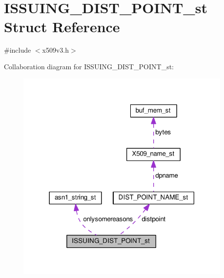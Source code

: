 \hypertarget{struct_i_s_s_u_i_n_g___d_i_s_t___p_o_i_n_t__st}{}\section{I\+S\+S\+U\+I\+N\+G\+\_\+\+D\+I\+S\+T\+\_\+\+P\+O\+I\+N\+T\+\_\+st Struct Reference}
\label{struct_i_s_s_u_i_n_g___d_i_s_t___p_o_i_n_t__st}


{\ttfamily \#include $<$x509v3.\+h$>$}



Collaboration diagram for I\+S\+S\+U\+I\+N\+G\+\_\+\+D\+I\+S\+T\+\_\+\+P\+O\+I\+N\+T\+\_\+st\+:
\nopagebreak
\begin{figure}[H]
\begin{center}
\leavevmode
\includegraphics[width=302pt]{struct_i_s_s_u_i_n_g___d_i_s_t___p_o_i_n_t__st__coll__graph}
\end{center}
\end{figure}
